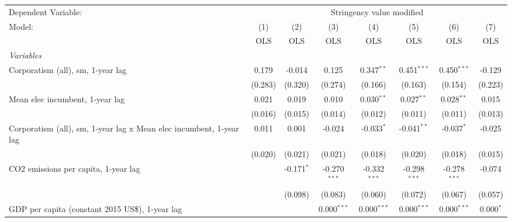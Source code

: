 
\begingroup
\centering
\begin{tabular}{lccccccc}
   \toprule
   Dependent Variable: & \multicolumn{7}{c}{Stringency value modified}\\
   Model:                                                              & (1)     & (2)          & (3)            & (4)            & (5)            & (6)            & (7)\\  
                                                                       &  OLS    & OLS          & OLS            & OLS            & OLS            & OLS            & OLS\\  
   \midrule
   \emph{Variables}\\
   Corporatism (all), sm, 1-year lag                                   & 0.179   & -0.014       & 0.125          & 0.347$^{**}$   & 0.451$^{***}$  & 0.450$^{***}$  & -0.129\\   
                                                                       & (0.283) & (0.320)      & (0.274)        & (0.166)        & (0.163)        & (0.154)        & (0.223)\\   
   Mean elec incumbent, 1-year lag                                     & 0.021   & 0.019        & 0.010          & 0.030$^{**}$   & 0.027$^{**}$   & 0.028$^{**}$   & 0.015\\   
                                                                       & (0.016) & (0.015)      & (0.014)        & (0.012)        & (0.011)        & (0.011)        & (0.013)\\   
   Corporatism (all), sm, 1-year lag x Mean elec incumbent, 1-year lag & 0.011   & 0.001        & -0.024         & -0.033$^{*}$   & -0.041$^{**}$  & -0.037$^{*}$   & -0.025\\   
                                                                       & (0.020) & (0.021)      & (0.021)        & (0.018)        & (0.020)        & (0.018)        & (0.015)\\   
   CO2 emissions per capita, 1-year lag                                &         & -0.171$^{*}$ & -0.270$^{***}$ & -0.332$^{***}$ & -0.298$^{***}$ & -0.278$^{***}$ & -0.074\\   
                                                                       &         & (0.098)      & (0.083)        & (0.060)        & (0.072)        & (0.067)        & (0.057)\\   
   GDP per capita (constant 2015 US\$), 1-year lag                     &         &              & 0.000$^{***}$  & 0.000$^{***}$  & 0.000$^{***}$  & 0.000$^{***}$  & 0.000$^{*}$\\   

\end{tabular}
